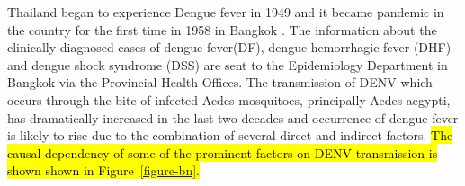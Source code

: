 \documentclass{bmcart}
\begin{document}
Thailand began to experience Dengue fever in 1949 and it became pandemic in the country for the first time in 1958 in Bangkok \cite{hammon1964virological}. The information about the clinically diagnosed cases of dengue fever(DF), dengue hemorrhagic fever (DHF) and dengue shock syndrome (DSS) are sent to the Epidemiology Department in Bangkok \cite{chareonsook1999changing} via the Provincial Health Offices. The transmission of DENV which occurs through the bite of infected Aedes mosquitoes, principally Aedes aegypti, has dramatically increased in the last two decades \cite{hesse2007dengue} and occurrence of dengue fever is likely to rise \cite{wilder2012denguetools} due to the combination of several direct and indirect factors. \hl{The causal dependency of some of the prominent factors on DENV transmission is shown shown in Figure~\ref{figure-bn}.}
\end{document}
